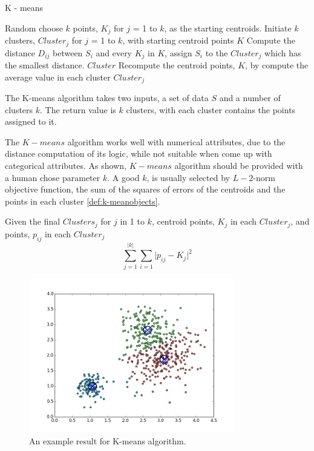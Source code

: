 \documentclass[utf8,english]{gradu3}
\begin{document}
\algrenewcommand\Return{\State \algorithmicreturn{} }%
\begin{algorithm}[h]
	\caption{K - means}
	\label{alg:kmeans}
	\begin{algorithmic}[1]
		\State Random choose $k$ points, $K_j$ for $j$ = 1 to $k$,  as the starting centroids.
		\State Initiate $k$ clusters, $Cluster_j$ for $j$ = 1 to $k$, with starting centroid points $K$
			    \State Compute the distance $D_{ij}$ between $S_i$ and every $K_j$ in $K$, assign $S_i$ to the $Cluster_j$ which has the smallest distance.
			\EndFor
				\Return $Cluster$
			\EndIf
			\State Recompute the centroid points, $K$, by compute the average value in each cluster $Cluster_j$
		\EndWhile
		\EndProcedure
		
		The K-means algorithm takes two inputs, a set of data $S$ and a number of clusters $k$. The return value is $k$ clusters, with each cluster contains the points assigned to it.
	\end{algorithmic}
\end{algorithm}

The $K-means$ algorithm works well with numerical attributes, due to the distance computation of its logic, while not suitable when come up with categorical attributes. As shown, $K-means$ algorithm should be provided with a human chose parameter $k$. A good $k$, is usually selected by $L-2$-norm objective function, the sum of the squares of errors of the centroids and the points in each cluster \ref{def:k-meanobjects}.

\begin{definition}
	\label{def:k-meanobjects}
	Given the final $Clusters_j$ for $j$ in 1 to $k$, centroid points, $K_j$ in each $Cluster_j$, and points, $p_{ij}$ in each $Cluster_j$
	\[
		\sum\limits_{j=1}^{\lvert  k\rvert } \sum\limits_{i=1} \lvert p_{ij} - K_j \lvert ^2
	\]
\end{definition}

\begin{figure}
	\centering
	\includegraphics[width=0.80\textwidth]{pic/kmeans.png}
	\caption{An example result for K-means algorithm.}
	\label{fig:kmeans}
\end{figure}
\end{document}
